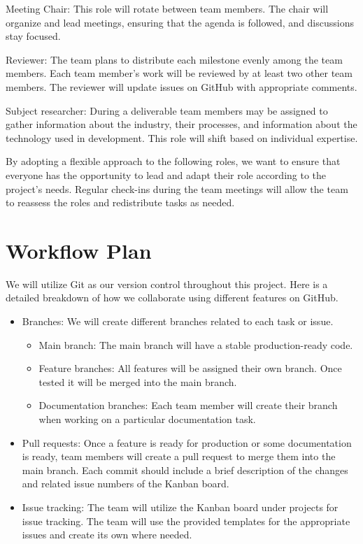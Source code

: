 \documentclass{article}
\begin{document}
Meeting Chair: This role will rotate between team members. The chair will organize and lead meetings, ensuring that the agenda is followed, and discussions stay focused.

Reviewer: The team plans to distribute each milestone evenly among the team members. Each team member’s work will be reviewed by at least two other team members. The reviewer will update issues on GitHub with appropriate comments.

Subject researcher: During a deliverable team members may be assigned to gather information about the industry, their processes, and information about the technology used in development. This role will shift based on individual expertise.

By adopting a flexible approach to the following roles, we want to ensure that everyone has the opportunity to lead and adapt their role according to the project’s needs. Regular check-ins during the team meetings will allow the team to reassess the roles and redistribute tasks as needed. 


\section{Workflow Plan}

We will utilize Git as our version control throughout this project. Here is a detailed breakdown of how we collaborate using different features on GitHub. 

\begin{itemize}
\item Branches: We will create different branches related to each task or issue. 
\begin{itemize}
\item Main branch: The main branch will have a stable production-ready code. 
\item Feature branches: All features will be assigned their own branch. Once tested it will be merged into the main branch.
\item Documentation branches: Each team member will create their branch when working on a particular documentation task. 
\end{itemize}

\item Pull requests: Once a feature is ready for production or some documentation is ready, team members will create a pull request to merge them into the main branch. Each commit should include a brief description of the changes and related issue numbers of the Kanban board.

\item Issue tracking: The team will utilize the Kanban board under projects for issue tracking. The team will use the provided templates for the appropriate issues and create its own where needed. 
\end{itemize}
\end{document}

